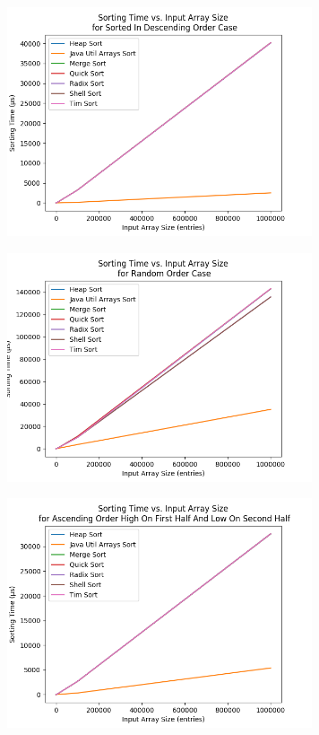 \begin{figure}[!htp]
\centering
\includegraphics[width=9cm]{figures/plots_without_BubbleSort_InsertionSort/sorting_time_vs_input_array_size_SortedInDescendingOrderCase.png}
\end{figure}

\begin{figure}[!htp]
\centering
\includegraphics[width=9cm]{figures/plots_without_BubbleSort_InsertionSort/sorting_time_vs_input_array_size_RandomOrderCase.png}
\end{figure}

\begin{figure}[!htp]
\centering
\includegraphics[width=9cm]{figures/plots_without_BubbleSort_InsertionSort/sorting_time_vs_input_array_size_AscendingOrderHighOnFirstHalfAndLowOnSecondHalf.png}
\end{figure}


